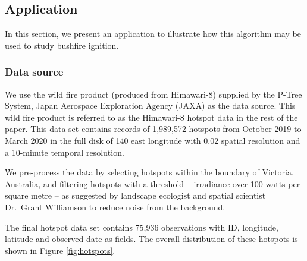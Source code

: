 \hypertarget{application}{%
\subsection{Application}\label{application}}

In this section, we present an application to illustrate how this
algorithm may be used to study bushfire ignition.

\hypertarget{data-source}{%
\subsubsection{Data source}\label{data-source}}

We use the wild fire product (produced from Himawari-8) supplied by the
P-Tree System, Japan Aerospace Exploration Agency (JAXA)
\citeyearpar{jaxa} as the data source. This wild fire product is
referred to as the Himawari-8 hotspot data in the rest of the paper.
This data set contains records of 1,989,572 hotspots from October 2019
to March 2020 in the full disk of 140 \textdegree east longitude with
0.02 \textdegree spatial resolution and a 10-minute temporal resolution.

We pre-process the data by selecting hotspots within the boundary of
Victoria, Australia, and filtering hotspots with a threshold --
irradiance over 100 watts per square metre -- as suggested by landscape
ecologist and spatial scientist Dr.~Grant Williamson
\citeyearpar{hotspots} to reduce noise from the background.

The final hotspot data set contains 75,936 observations with ID,
longitude, latitude and observed date as fields. The overall
distribution of these hotspots is shown in Figure \ref{fig:hotspots}.

